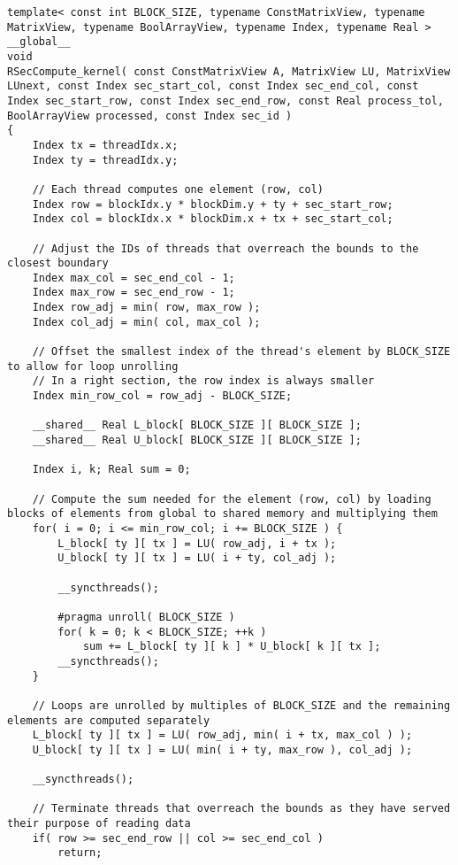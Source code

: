 \begin{lstlisting}[caption={Implementation of the \code{RSecCompute\_kernel()} kernel which computes one iteration of a right section.},label={Listing:ICMxPP-implementation->kernels->right-section-compute}]
template< const int BLOCK_SIZE, typename ConstMatrixView, typename MatrixView, typename BoolArrayView, typename Index, typename Real >
__global__
void
RSecCompute_kernel( const ConstMatrixView A, MatrixView LU, MatrixView LUnext, const Index sec_start_col, const Index sec_end_col, const Index sec_start_row, const Index sec_end_row, const Real process_tol, BoolArrayView processed, const Index sec_id )
{
	Index tx = threadIdx.x;
	Index ty = threadIdx.y;
	
	// Each thread computes one element (row, col)
	Index row = blockIdx.y * blockDim.y + ty + sec_start_row;
	Index col = blockIdx.x * blockDim.x + tx + sec_start_col;
	
	// Adjust the IDs of threads that overreach the bounds to the closest boundary
	Index max_col = sec_end_col - 1;
	Index max_row = sec_end_row - 1;
	Index row_adj = min( row, max_row );
	Index col_adj = min( col, max_col );
	
	// Offset the smallest index of the thread's element by BLOCK_SIZE to allow for loop unrolling
	// In a right section, the row index is always smaller
	Index min_row_col = row_adj - BLOCK_SIZE;
	
	__shared__ Real L_block[ BLOCK_SIZE ][ BLOCK_SIZE ];
	__shared__ Real U_block[ BLOCK_SIZE ][ BLOCK_SIZE ];
	
	Index i, k; Real sum = 0;
	
	// Compute the sum needed for the element (row, col) by loading blocks of elements from global to shared memory and multiplying them
	for( i = 0; i <= min_row_col; i += BLOCK_SIZE ) {
		L_block[ ty ][ tx ] = LU( row_adj, i + tx );
		U_block[ ty ][ tx ] = LU( i + ty, col_adj );
		
		__syncthreads();
		
		#pragma unroll( BLOCK_SIZE )
		for( k = 0; k < BLOCK_SIZE; ++k )
			sum += L_block[ ty ][ k ] * U_block[ k ][ tx ];
		__syncthreads();
	}
	
	// Loops are unrolled by multiples of BLOCK_SIZE and the remaining elements are computed separately
	L_block[ ty ][ tx ] = LU( row_adj, min( i + tx, max_col ) );
	U_block[ ty ][ tx ] = LU( min( i + ty, max_row ), col_adj );
	
	__syncthreads();
	
	// Terminate threads that overreach the bounds as they have served their purpose of reading data
	if( row >= sec_end_row || col >= sec_end_col )
		return;
	

\end{lstlisting}
